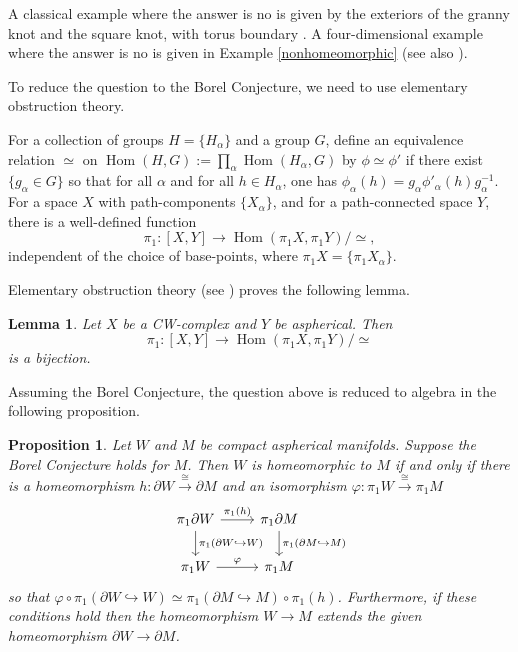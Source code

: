 \documentclass[12pt]{amsart}
\newtheorem{lemma}[theorem]{Lemma}
\newtheorem{proposition}[theorem]{Proposition}
\theoremstyle{definition}
\DeclareMathOperator{\Hom}{Hom}
\begin{document}
A classical example where the answer is no is given by the exteriors of the granny knot and the square knot, with torus boundary \cite{Fox}.   A four-dimensional example where the answer is no is given in Example \ref{nonhomeomorphic} (see also \cite{DH2}).

To reduce the question to the Borel Conjecture, we need to use elementary obstruction theory. 

For a collection of groups $H = \{H_\alpha\}$ and a group $G $, define an equivalence relation $\simeq$ on $\Hom(H,G):= \prod_\alpha \Hom(H_\alpha,G)$ by $\phi \simeq \phi'$ if there exist $\{g_\alpha \in G\}$ so that for all $\alpha$ and for all $h \in H_\alpha$, one has $\phi_\alpha (h) = g_\alpha \phi'_\alpha (h)  g_\alpha^{-1}$.   For a space $X$ with path-components $\{X_\alpha\}$, and for a path-connected space $Y$, there is a well-defined function
$$
\pi_1: [X,Y] \to \Hom(\pi_1X,\pi_1Y)/\simeq,
$$
independent of the choice of base-points, where $\pi_1X = \{\pi_1X_\alpha\}$.


Elementary obstruction theory (see \cite[Theorems 7.26 and 6.57]{DK}) proves the following lemma.

\begin{lemma} \label{ot}
Let $X$ be a CW-complex and $Y$ be aspherical.    Then
$$
\pi_1 : [X,Y] \to \Hom(\pi_1X,\pi_1Y)/\simeq
$$ 
is a bijection.
\end{lemma}

Assuming the Borel Conjecture, the question above is reduced to algebra in the following proposition.

\begin{proposition}  \label{BC_ot}
Let $W$ and $M$ be compact aspherical manifolds.   Suppose the Borel Conjecture holds for $M$.   Then $W$ is homeomorphic to $M$ if and only if there is a homeomorphism $h: \partial W \xrightarrow{\cong} \partial M$ and an isomorphism $\varphi: \pi_1 W \xrightarrow{\cong} \pi_1M$  
$$
\begin{tikzcd}
\pi_1 \partial W \arrow[r,"\pi_1(h)"] \arrow[d,"\pi_1(\partial W \hookrightarrow W)"] & \pi_1\partial M \arrow[d,"\pi_1(\partial M \hookrightarrow M)"] \\
\pi_1 W \arrow[r,"\varphi"] & \pi_1M
\end{tikzcd}
$$
so that  $\varphi \circ \pi_1(\partial W \hookrightarrow W) \simeq  \pi_1(\partial M\hookrightarrow M) \circ \pi_1(h) $. Furthermore, if these conditions hold then the homeomorphism $W \to M$ extends the given homeomorphism $\partial W \to \partial M$.
\end{proposition}
\end{document}
